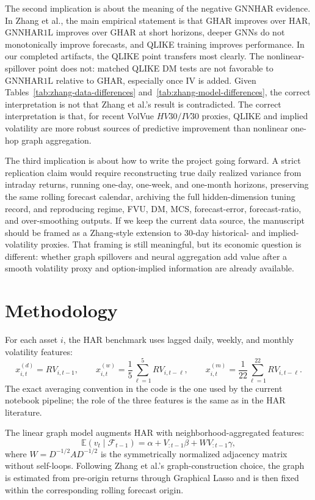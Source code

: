 \documentclass[11pt]{article}
\begin{document}
The second implication is about the meaning of the negative GNNHAR evidence.
In Zhang et al., the main empirical statement is that \(\mathrm{GHAR}\) improves over \(\mathrm{HAR}\), \(\mathrm{GNNHAR1L}\) improves over \(\mathrm{GHAR}\) at short horizons, deeper GNNs do not monotonically improve forecasts, and QLIKE training improves performance.
In our completed artifacts, the QLIKE point transfers most clearly.
The nonlinear-spillover point does not: matched QLIKE DM tests are not favorable to \(\mathrm{GNNHAR1L}\) relative to \(\mathrm{GHAR}\), especially once IV is added.
Given Tables~\ref{tab:zhang-data-differences} and~\ref{tab:zhang-model-differences}, the correct interpretation is not that Zhang et al.'s result is contradicted.
The correct interpretation is that, for recent VolVue \(HV30/IV30\) proxies, QLIKE and implied volatility are more robust sources of predictive improvement than nonlinear one-hop graph aggregation.

The third implication is about how to write the project going forward.
A strict replication claim would require reconstructing true daily realized variance from intraday returns, running one-day, one-week, and one-month horizons, preserving the same rolling forecast calendar, archiving the full hidden-dimension tuning record, and reproducing regime, FVU, DM, MCS, forecast-error, forecast-ratio, and over-smoothing outputs.
If we keep the current data source, the manuscript should be framed as a Zhang-style extension to 30-day historical- and implied-volatility proxies.
That framing is still meaningful, but its economic question is different: whether graph spillovers and neural aggregation add value after a smooth volatility proxy and option-implied information are already available.

\section{Methodology}

For each asset \(i\), the HAR benchmark uses lagged daily, weekly, and monthly volatility features:
\[
  x^{(d)}_{i,t}=RV_{i,t-1}, \qquad
  x^{(w)}_{i,t}=\frac{1}{5}\sum_{\ell=1}^{5}RV_{i,t-\ell}, \qquad
  x^{(m)}_{i,t}=\frac{1}{22}\sum_{\ell=1}^{22}RV_{i,t-\ell}.
\]
The exact averaging convention in the code is the one used by the current notebook pipeline; the role of the three features is the same as in the HAR literature.

The linear graph model augments HAR with neighborhood-aggregated features:
\[
  \mathbb{E}(v_t\mid \mathcal{F}_{t-1})
  =
  \alpha
  +
  V_{:t-1}\beta
  +
  W V_{:t-1}\gamma,
\]
where \(W=D^{-1/2}AD^{-1/2}\) is the symmetrically normalized adjacency matrix without self-loops.
Following Zhang et al.'s graph-construction choice, the graph is estimated from pre-origin returns through Graphical Lasso and is then fixed within the corresponding rolling forecast origin.
\end{document}
